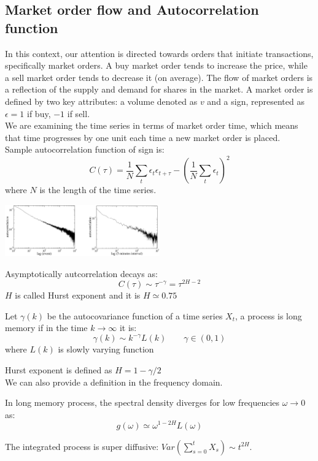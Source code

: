 \subsection{Market order flow and Autocorrelation function}
In this context, our attention is directed towards orders that initiate transactions, specifically market orders. A buy market order tends to increase the price, while a sell market order tends to decrease it (on average). The flow of market orders is a reflection of the supply and demand for shares in the market.
A market order is defined by two key attributes: a volume denoted as $v$ and a sign, represented as $\epsilon = 1$ if buy, $-1$ if sell.\\
We are examining the time series in terms of market order time, which means that time progresses by one unit each time a new market order is placed.\\
Sample autocorrelation function of sign is:
\[
C(\tau) = \frac{1}{N} \sum_t \epsilon_t\epsilon_{t +\tau} - \left(\frac{1}{N} \sum_t \epsilon_t\right)^2
\]
where $N$ is the length of the time series.
\begin{center}
	\includegraphics[width=0.5\textwidth]{picture/(4)autocorr_order_flow.png}
\end{center}
Asymptotically autcorrelation decays as:
\[
C(\tau) \sim \tau^{-\gamma} = \tau^{2H-2}
\]
$H$ is called Hurst exponent and it is $H \simeq 0.75$
\begin{mydefinition}
Let $\gamma(k)$ be the autocovariance function of a time series $X_t$, a process is long memory if in the time $k \to \infty$ it is:
\[
\gamma(k) \sim k^{-\gamma} L(k) \qquad \gamma \in (0,1)
\]
where $L(k)$ is slowly varying function
\end{mydefinition}
Hurst exponent is defined as $H = 1- \gamma /2$\\
We can also provide a definition in the frequency domain.
\begin{mydefinition}
In long memory process, the spectral density diverges for low frequencies $\omega \to 0$ as:
\[
g(\omega) \simeq \omega^{1- 2H} L(\omega)
\]
\end{mydefinition}
The integrated process is super diffusive: $Var(\sum_{s=0}^{t} X_s) \sim t^{2H}$.\\

